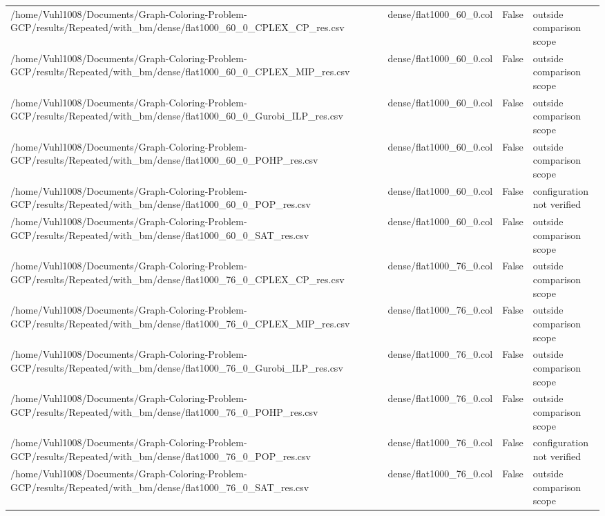 \begin{table}[htbp]
\begin{tabular}{llll}
/home/Vuhl1008/Documents/Graph-Coloring-Problem-GCP/results/Repeated/with\_bm/dense/flat1000\_60\_0\_CPLEX\_CP\_res.csv & dense/flat1000\_60\_0.col & False & outside comparison scope \\
/home/Vuhl1008/Documents/Graph-Coloring-Problem-GCP/results/Repeated/with\_bm/dense/flat1000\_60\_0\_CPLEX\_MIP\_res.csv & dense/flat1000\_60\_0.col & False & outside comparison scope \\
/home/Vuhl1008/Documents/Graph-Coloring-Problem-GCP/results/Repeated/with\_bm/dense/flat1000\_60\_0\_Gurobi\_ILP\_res.csv & dense/flat1000\_60\_0.col & False & outside comparison scope \\
/home/Vuhl1008/Documents/Graph-Coloring-Problem-GCP/results/Repeated/with\_bm/dense/flat1000\_60\_0\_POHP\_res.csv & dense/flat1000\_60\_0.col & False & outside comparison scope \\
/home/Vuhl1008/Documents/Graph-Coloring-Problem-GCP/results/Repeated/with\_bm/dense/flat1000\_60\_0\_POP\_res.csv & dense/flat1000\_60\_0.col & False & configuration not verified \\
/home/Vuhl1008/Documents/Graph-Coloring-Problem-GCP/results/Repeated/with\_bm/dense/flat1000\_60\_0\_SAT\_res.csv & dense/flat1000\_60\_0.col & False & outside comparison scope \\
/home/Vuhl1008/Documents/Graph-Coloring-Problem-GCP/results/Repeated/with\_bm/dense/flat1000\_76\_0\_CPLEX\_CP\_res.csv & dense/flat1000\_76\_0.col & False & outside comparison scope \\
/home/Vuhl1008/Documents/Graph-Coloring-Problem-GCP/results/Repeated/with\_bm/dense/flat1000\_76\_0\_CPLEX\_MIP\_res.csv & dense/flat1000\_76\_0.col & False & outside comparison scope \\
/home/Vuhl1008/Documents/Graph-Coloring-Problem-GCP/results/Repeated/with\_bm/dense/flat1000\_76\_0\_Gurobi\_ILP\_res.csv & dense/flat1000\_76\_0.col & False & outside comparison scope \\
/home/Vuhl1008/Documents/Graph-Coloring-Problem-GCP/results/Repeated/with\_bm/dense/flat1000\_76\_0\_POHP\_res.csv & dense/flat1000\_76\_0.col & False & outside comparison scope \\
/home/Vuhl1008/Documents/Graph-Coloring-Problem-GCP/results/Repeated/with\_bm/dense/flat1000\_76\_0\_POP\_res.csv & dense/flat1000\_76\_0.col & False & configuration not verified \\
/home/Vuhl1008/Documents/Graph-Coloring-Problem-GCP/results/Repeated/with\_bm/dense/flat1000\_76\_0\_SAT\_res.csv & dense/flat1000\_76\_0.col & False & outside comparison scope \\

\end{tabular}
\end{table}
